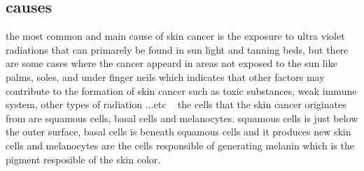     \subsection{causes}
        the most common and main cause of skin cancer is the exposure to ultra violet ~\cite{mayo2020, scf2022, nhs2020} radiations that can primarely be found in sun light and tanning beds, but there are some cases where the cancer appeard in areas not exposed to the sun like palms, soles, and under finger neils which indicates that other factors may contribute to the formation of skin cancer such as toxic substances, weak immune system, other types of radiation ...etc ~\cite{mayo2020}
        the cells that the skin cancer originates from are squamous cells, basal cells and melanocytes. squamous cells is just below the outer surface, basal cells is beneath squamous cells and it produces new skin cells and melanocytes are the cells responsible of generating melanin which is the pigment resposible of the skin color. ~\cite{mayo2020}  


